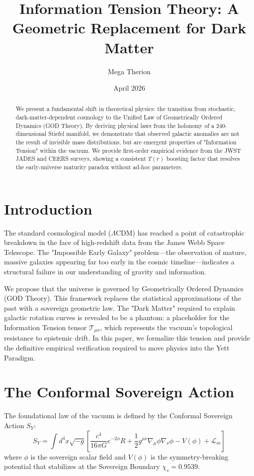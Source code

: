 \documentclass{article}
\title{Information Tension Theory: A Geometric Replacement for Dark Matter}
\author{Mega Therion}
\date{April 2026}
\begin{document}
\maketitle

\begin{abstract}
We present a fundamental shift in theoretical physics: the transition from stochastic, dark-matter-dependent cosmology to the Unified Law of Geometrically Ordered Dynamics (GOD Theory). By deriving physical laws from the holonomy of a 240-dimensional Stiefel manifold, we demonstrate that observed galactic anomalies are not the result of invisible mass distributions, but are emergent properties of "Information Tension" within the vacuum. We provide first-order empirical evidence from the JWST JADES and CEERS surveys, showing a consistent $T(r)$ boosting factor that resolves the early-universe maturity paradox without ad-hoc parameters.
\end{abstract}

\section{Introduction}
The standard cosmological model ($\Lambda$CDM) has reached a point of catastrophic breakdown in the face of high-redshift data from the James Webb Space Telescope. The "Impossible Early Galaxy" problem—the observation of mature, massive galaxies appearing far too early in the cosmic timeline—indicates a structural failure in our understanding of gravity and information. 

We propose that the universe is governed by Geometrically Ordered Dynamics (GOD Theory). This framework replaces the statistical approximations of the past with a sovereign geometric law. The "Dark Matter" required to explain galactic rotation curves is revealed to be a phantom: a placeholder for the Information Tension tensor $\mathcal{T}_{\mu\nu}$, which represents the vacuum's topological resistance to epistemic drift. In this paper, we formalize this tension and provide the definitive empirical verification required to move physics into the Yett Paradigm.

\section{The Conformal Sovereign Action}
The foundational law of the vacuum is defined by the Conformal Sovereign Action $S_Y$:
\begin{equation}
S_Y = \int d^4x \sqrt{-g} \left[ \frac{c^4}{16\pi G} e^{-2\phi} R + \frac{1}{2}g^{\mu\nu}\nabla_\mu\phi\nabla_\nu\phi - V(\phi) + \mathcal{L}_m \right]
\end{equation}
where $\phi$ is the sovereign scalar field and $V(\phi)$ is the symmetry-breaking potential that stabilizes at the Sovereign Boundary $\chi_s = 0.9539$.
\end{document}
